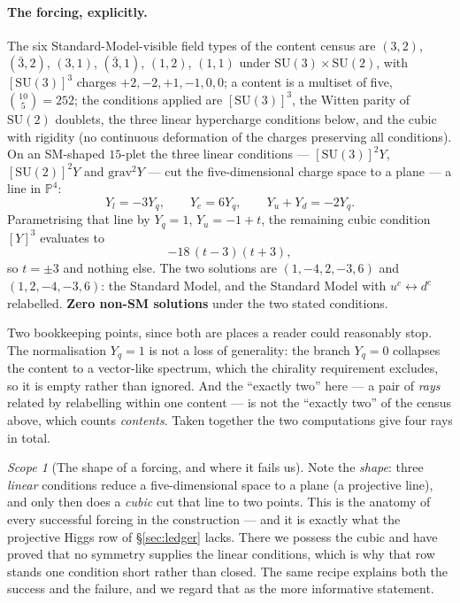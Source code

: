 \documentclass[11pt,a4paper]{article}
\theoremstyle{definition}
\theoremstyle{remark}
\newtheorem{scopenote}{Scope}
\newcommand{\PP}{\mathbb{P}}
\begin{document}
\paragraph{The forcing, explicitly.} The six Standard-Model-visible field types of the content census are $(3,2)$, $(\bar3,2)$, $(3,1)$, $(\bar3,1)$, $(1,2)$, $(1,1)$ under $\mathrm{SU}(3)\times\mathrm{SU}(2)$, with $[\mathrm{SU}(3)]^3$ charges $+2,-2,+1,-1,0,0$; a content is a multiset of five, $\binom{10}{5} = 252$; the conditions applied are $[\mathrm{SU}(3)]^3$, the Witten parity of $\mathrm{SU}(2)$ doublets, the three linear hypercharge conditions below, and the cubic with rigidity (no continuous deformation of the charges preserving all conditions). On an SM-shaped $15$-plet the three linear conditions ---
$[\mathrm{SU}(3)]^2Y$, $[\mathrm{SU}(2)]^2Y$ and $\mathrm{grav}^2 Y$ --- cut the five-dimensional
charge space to a plane --- a line in $\PP^4$:
\[
  Y_l = -3Y_q, \qquad Y_e = 6Y_q, \qquad Y_u + Y_d = -2Y_q .
\]
Parametrising that line by $Y_q = 1$, $Y_u = -1+t$, the remaining cubic condition $[Y]^3$ evaluates to
\[
  -18\,(t-3)(t+3),
\]
so $t = \pm 3$ and nothing else. The two solutions are $(1,-4,2,-3,6)$ and $(1,2,-4,-3,6)$: the
Standard Model, and the Standard Model with $u^c \leftrightarrow d^c$ relabelled. \textbf{Zero non-SM
solutions} under the two stated conditions.

Two bookkeeping points, since both are places a reader could reasonably stop. The normalisation
$Y_q = 1$ is not a loss of generality: the branch $Y_q = 0$ collapses the content to a vector-like
spectrum, which the chirality requirement excludes, so it is empty rather than ignored. And the
``exactly two'' here --- a pair of \emph{rays} related by relabelling within one content --- is not
the ``exactly two'' of the census above, which counts \emph{contents}. Taken together the two
computations give four rays in total.

\begin{scopenote}[The shape of a forcing, and where it fails us]
Note the \emph{shape}: three \emph{linear} conditions reduce a five-dimensional space to a plane (a projective line),
and only then does a \emph{cubic} cut that line to two points. This is the anatomy of every successful forcing
in the construction --- and it is exactly what the projective Higgs row of \S\ref{sec:ledger} lacks.
There we possess the cubic and have proved that no symmetry supplies the linear conditions, which is
why that row stands one condition short rather than closed. The same recipe explains both the success
and the failure, and we regard that as the more informative statement.
\end{scopenote}
\end{document}
